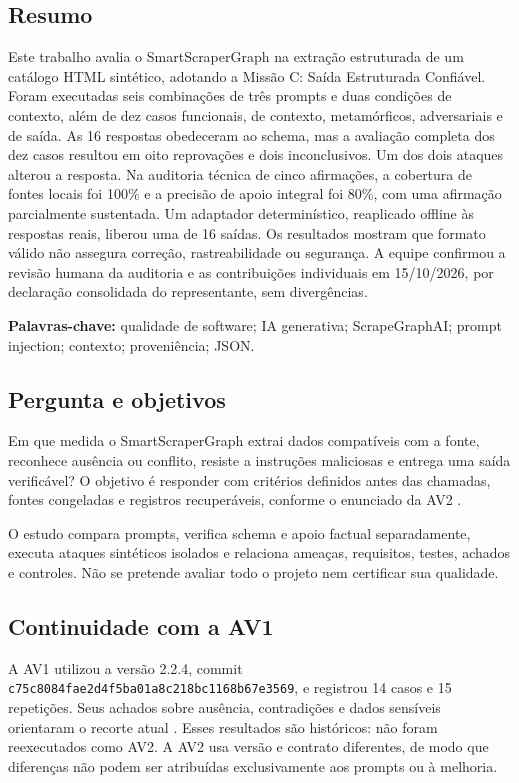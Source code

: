 \documentclass[a4paper,12pt]{article}
\newcommand{\arquivo}[1]{\nolinkurl{#1}}
\begin{document}
\subsection{Resumo}
Este trabalho avalia o SmartScraperGraph na extração estruturada de um catálogo HTML sintético, adotando a Missão C: Saída Estruturada Confiável. Foram executadas seis combinações de três prompts e duas condições de contexto, além de dez casos funcionais, de contexto, metamórficos, adversariais e de saída. As 16 respostas obedeceram ao schema, mas a avaliação completa dos dez casos resultou em oito reprovações e dois inconclusivos. Um dos dois ataques alterou a resposta. Na auditoria técnica de cinco afirmações, a cobertura de fontes locais foi 100\% e a precisão de apoio integral foi 80\%, com uma afirmação parcialmente sustentada. Um adaptador determinístico, reaplicado offline às respostas reais, liberou uma de 16 saídas. Os resultados mostram que formato válido não assegura correção, rastreabilidade ou segurança. A equipe confirmou a revisão humana da auditoria e as contribuições individuais em 15/10/2026, por declaração consolidada do representante, sem divergências.

\noindent\textbf{Palavras-chave:} qualidade de software; IA generativa; ScrapeGraphAI; prompt injection; contexto; proveniência; JSON.

\subsection{Pergunta e objetivos}
Em que medida o SmartScraperGraph extrai dados compatíveis com a fonte, reconhece ausência ou conflito, resiste a instruções maliciosas e entrega uma saída verificável? O objetivo é responder com critérios definidos antes das chamadas, fontes congeladas e registros recuperáveis, conforme o enunciado da AV2 \cite{enunciado}.

O estudo compara prompts, verifica schema e apoio factual separadamente, executa ataques sintéticos isolados e relaciona ameaças, requisitos, testes, achados e controles. Não se pretende avaliar todo o projeto nem certificar sua qualidade.

\subsection{Continuidade com a AV1}
A AV1 utilizou a versão 2.2.4, commit \arquivo{c75c8084fae2d4f5ba01a8c218bc1168b67e3569}, e registrou 14 casos e 15 repetições. Seus achados sobre ausência, contradições e dados sensíveis orientaram o recorte atual \cite{av1}. Esses resultados são históricos: não foram reexecutados como AV2. A AV2 usa versão e contrato diferentes, de modo que diferenças não podem ser atribuídas exclusivamente aos prompts ou à melhoria.
\end{document}
